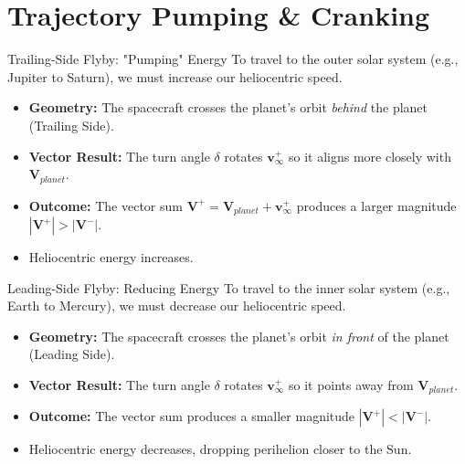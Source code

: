 \documentclass[11pt]{beamer}
\begin{document}
\section{Trajectory Pumping \& Cranking}

\begin{frame}{Trailing-Side Flyby: "Pumping" Energy}
    To travel to the outer solar system (e.g., Jupiter to Saturn), we must increase our heliocentric speed.
    
    \begin{itemize}
        \item \textbf{Geometry:} The spacecraft crosses the planet's orbit \textit{behind} the planet (Trailing Side).
        \item \textbf{Vector Result:} The turn angle $\delta$ rotates $\bm{v}_{\infty}^+$ so it aligns more closely with $\bm{V}_{planet}$.
        \item \textbf{Outcome:} The vector sum $\bm{V}^+ = \bm{V}_{planet} + \bm{v}_{\infty}^+$ produces a larger magnitude $|\bm{V}^+| > |\bm{V}^-|$. 
        \item Heliocentric energy increases.
    \end{itemize}
\end{frame}

\begin{frame}{Leading-Side Flyby: Reducing Energy}
    To travel to the inner solar system (e.g., Earth to Mercury), we must decrease our heliocentric speed.
    
    \begin{itemize}
        \item \textbf{Geometry:} The spacecraft crosses the planet's orbit \textit{in front} of the planet (Leading Side).
        \item \textbf{Vector Result:} The turn angle $\delta$ rotates $\bm{v}_{\infty}^+$ so it points away from $\bm{V}_{planet}$.
        \item \textbf{Outcome:} The vector sum produces a smaller magnitude $|\bm{V}^+| < |\bm{V}^-|$.
        \item Heliocentric energy decreases, dropping perihelion closer to the Sun.
    \end{itemize}
\end{frame}
\end{document}
